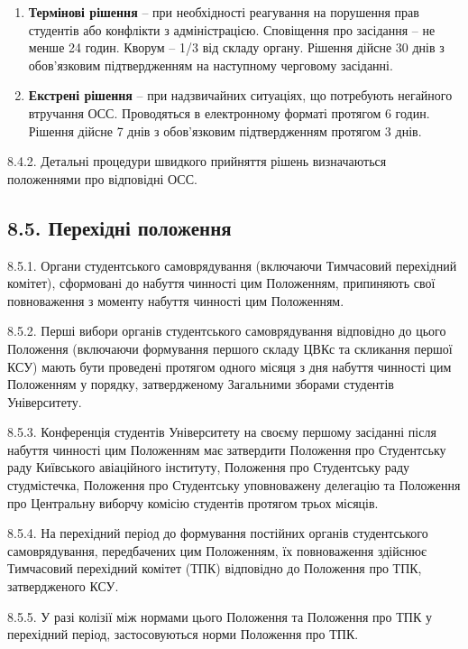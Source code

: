         \begin{enumerate}[label=\alph*)]
            \item \textbf{Термінові рішення} -- при необхідності реагування на порушення прав студентів або конфлікти з адміністрацією. Сповіщення про засідання -- не менше 24 годин. Кворум -- 1/3 від складу органу. Рішення дійсне 30 днів з обов'язковим підтвердженням на наступному черговому засіданні.
            
            \item \textbf{Екстрені рішення} -- при надзвичайних ситуаціях, що потребують негайного втручання ОСС. Проводяться в електронному форматі протягом 6 годин. Рішення дійсне 7 днів з обов'язковим підтвердженням протягом 3 днів.
        \end{enumerate}

    8.4.2. Детальні процедури швидкого прийняття рішень визначаються положеннями про відповідні ОСС.

\subsection*{8.5. Перехідні положення}
    8.5.1. Органи студентського самоврядування (включаючи Тимчасовий перехідний комітет), сформовані до набуття чинності цим Положенням, припиняють свої повноваження з моменту набуття чинності цим Положенням.

    8.5.2. Перші вибори органів студентського самоврядування відповідно до цього Положення (включаючи формування першого складу ЦВКс та скликання першої КСУ) мають бути проведені протягом одного місяця з дня набуття чинності цим Положенням у порядку, затвердженому Загальними зборами студентів Університету.

    8.5.3. Конференція студентів Університету на своєму першому засіданні після набуття чинності цим Положенням має затвердити Положення про Студентську раду Київського авіаційного інституту, Положення про Студентську раду студмістечка, Положення про Студентську уповноважену делегацію та Положення про Центральну виборчу комісію студентів протягом трьох місяців.

    8.5.4. На перехідний період до формування постійних органів студентського самоврядування, передбачених цим Положенням, їх повноваження здійснює Тимчасовий перехідний комітет (ТПК) відповідно до Положення про ТПК, затвердженого КСУ.

    8.5.5. У разі колізії між нормами цього Положення та Положення про ТПК у перехідний період, застосовуються норми Положення про ТПК.